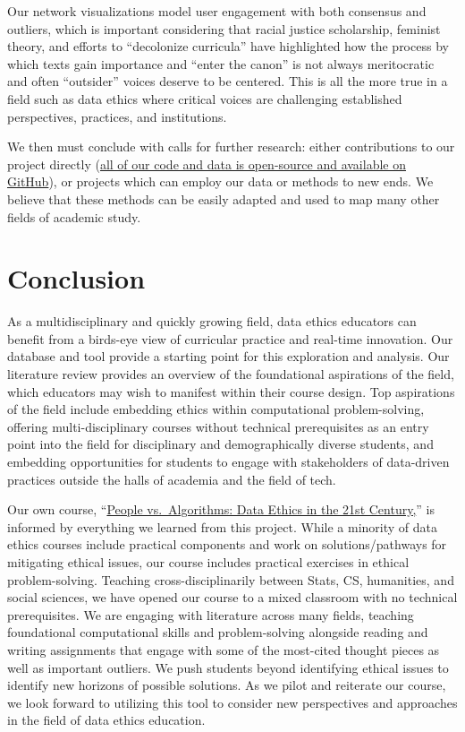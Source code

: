\documentclass[
]{article}
\begin{document}
Our network visualizations model user engagement with both consensus and
outliers, which is important considering that racial justice
scholarship, feminist theory, and efforts to ``decolonize curricula''
have highlighted how the process by which texts gain importance and
``enter the canon'' is not always meritocratic and often ``outsider''
voices deserve to be centered. This is all the more true in a field such
as data ethics where critical voices are challenging established
perspectives, practices, and institutions.

We then must conclude with calls for further research: either
contributions to our project directly
(\href{https://github.com/JonathanReeve/data-ethics-literature-review}{all
of our code and data is open-source and available on GitHub}), or
projects which can employ our data or methods to new ends. We believe
that these methods can be easily adapted and used to map many other
fields of academic study.

\hypertarget{conclusion}{%
\section{Conclusion}\label{conclusion}}

As a multidisciplinary and quickly growing field, data ethics educators
can benefit from a birds-eye view of curricular practice and real-time
innovation. Our database and tool provide a starting point for this
exploration and analysis. Our literature review provides an overview of
the foundational aspirations of the field, which educators may wish to
manifest within their course design. Top aspirations of the field
include embedding ethics within computational problem-solving, offering
multi-disciplinary courses without technical prerequisites as an entry
point into the field for disciplinary and demographically diverse
students, and embedding opportunities for students to engage with
stakeholders of data-driven practices outside the halls of academia and
the field of tech.

Our own course, ``\href{http://data-ethics.jonreeve.com/}{People
vs.~Algorithms: Data Ethics in the 21st Century,}'' is informed by
everything we learned from this project. While a minority of data ethics
courses include practical components and work on solutions/pathways for
mitigating ethical issues, our course includes practical exercises in
ethical problem-solving. Teaching cross-disciplinarily between Stats,
CS, humanities, and social sciences, we have opened our course to a
mixed classroom with no technical prerequisites. We are engaging with
literature across many fields, teaching foundational computational
skills and problem-solving alongside reading and writing assignments
that engage with some of the most-cited thought pieces as well as
important outliers. We push students beyond identifying ethical issues
to identify new horizons of possible solutions. As we pilot and
reiterate our course, we look forward to utilizing this tool to consider
new perspectives and approaches in the field of data ethics education.
\end{document}
